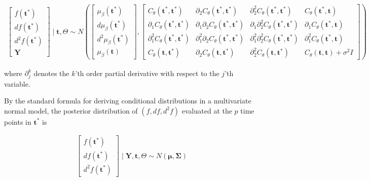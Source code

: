 \documentclass[11pt,]{article}
\theoremstyle{nonumberplain}
\begin{document}
\begin{align*}
  \begin{bmatrix}f(\mathbf{t}^\ast)\\ df(\mathbf{t}^\ast)\\ d^2\!f(\mathbf{t}^\ast)\\ \mathbf{Y}\end{bmatrix} \mid \mathbf{t}, \Theta \sim N\left(\begin{bmatrix}\mu_\beta(\mathbf{t}^\ast)\\ d\mu_\beta(\mathbf{t}^\ast)\\ d^2\mu_\beta(\mathbf{t}^\ast)\\ \mu_\beta(\mathbf{t})\end{bmatrix}, \begin{bmatrix}C_\theta(\mathbf{t}^\ast,\mathbf{t}^\ast) & \partial_2 C_\theta(\mathbf{t}^\ast, \mathbf{t}^\ast) & \partial_2^2 C_\theta(\mathbf{t}^\ast, \mathbf{t}^\ast) & C_\theta(\mathbf{t}^\ast, \mathbf{t})\\ \partial_1 C_\theta(\mathbf{t}^\ast, \mathbf{t}^\ast) &  \partial_1 \partial_2 C_\theta(\mathbf{t}^\ast, \mathbf{t}^\ast) & \partial_1 \partial_2^2 C_\theta(\mathbf{t}^\ast, \mathbf{t}^\ast) & \partial_1 C_\theta(\mathbf{t}^\ast, \mathbf{t})\\ \partial_1^2 C_\theta(\mathbf{t}^\ast, \mathbf{t}^\ast) & \partial_1^2\partial_2 C_\theta(\mathbf{t}^\ast, \mathbf{t}^\ast) & \partial_1^2\partial_2^2 C_\theta(\mathbf{t}^\ast, \mathbf{t}^\ast) & \partial_1^2 C_\theta(\mathbf{t}^\ast, \mathbf{t})\\ C_\theta(\mathbf{t}, \mathbf{t}^\ast) & \partial_2 C_\theta(\mathbf{t}, \mathbf{t}^\ast) & \partial_2^2 C_\theta(\mathbf{t}, \mathbf{t}^\ast)  & C_\theta(\mathbf{t}, \mathbf{t}) + \sigma^2 I\end{bmatrix}\right)
\end{align*}

where \(\partial_j^k\) denotes the \(k\)'th order partial derivative
with respect to the \(j\)'th variable.

By the standard formula for deriving conditional distributions in a
multivariate normal model, the posterior distribution of
\((f, df, d^2\!f)\) evaluated at the \(p\) time points in
\(\mathbf{t}^\ast\) is

\begin{align*}
\begin{bmatrix}f(\mathbf{t}^\ast)\\ df(\mathbf{t}^\ast)\\ d^2\!f(\mathbf{t}^\ast)\end{bmatrix} \mid \mathbf{Y}, \mathbf{t}, \Theta \sim N\left(\bm{\mu}, \bm{\Sigma}\right)
\end{align*}
\end{document}
